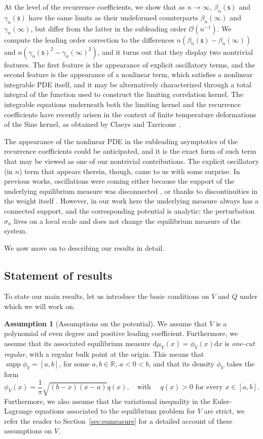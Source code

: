 \documentclass[reqno,a4paper,11pt]{amsart}
\DeclareMathOperator{\supp}{supp}
\newcommand{\R}{\mathbb{R}}
\newcommand{\Boh}{\mathcal{O}}
\newcommand{\dd}{\mathrm{d}}
\newcommand{\msf}{\mathsf}
\newcommand{\sad}{\msf s}
\theoremstyle{definition}
\newtheorem{assumption}[theorem]{Assumption}
\theoremstyle{remark}
\numberwithin{equation}{section}
\begin{document}
At the level of the recurrence coefficients, we show that as $n\to\infty$, $\beta_n(\sad)$ and $\gamma_n(\sad)$ have the same limits as their undeformed counterparts $\beta_n(\infty)$ and $\gamma_n(\infty)$, but differ from the latter in the subleading order $\Boh(n^{-1})$. We compute the leading order correction to the differences $n(\beta_n(\sad)-\beta_n(\infty))$ and $n(\gamma_n(\sad)^2-\gamma_n(\infty)^2)$, and it turns out that they display two nontrivial features. The first feature is the appearance of explicit oscillatory terms, and the second feature is the appearance of a nonlinear term, which satisfies a nonlinear integrable PDE itself, and it may be alternatively characterized through a total integral of the function used to construct the limiting correlation kernel. The integrable equations underneath both the limiting kernel and the recurrence coefficients have recently arisen in the context of finite temperature deformations of the Sine kernel, as obtained by Claeys and Tarricone \cite{ClaeysTarricone24}. 

The appearance of the nonlinear PDE in the subleading asymptotics of the recurrence coefficients could be anticipated, and it is the exact form of such term that may be viewed as one of our nontrivial contributions. The explicit oscillatory (in $n$) term that appears therein, though, came to us with some surprise. In previous works, oscillations were coming either because the support of the underlying equilibrium measure was disconnected \cite{bleher_its, DKMVZ1}, or thanks to discontinuities in the weight itself \cite{FoulquieMartinezFinkelshteinSousa2011}. However, in our work here the underlying measure always has a connected support, and the corresponding potential is analytic: the perturbation $\sigma_n$ lives on a local scale and does not change the equilibrium measure of the system.

We now move on to describing our results in detail.

\subsection{Statement of results}\hfill 

To state our main results, let us introduce the basic conditions on $V$ and $Q$ under which we will work on.

\begin{assumption}[Assumptions on the potential]\label{asump:V}
We assume that $V$ is a polynomial of even degree and positive leading coefficient. Furthermore, we assume that its associated equilibrium measure $\dd \mu_V(x) = \phi_V(x)\dd x$ is {\it one-cut regular}, with a regular bulk point at the origin. This means that $\supp\phi_V=[a,b]$, for some $a,b\in \R$, $a<0<b$, and that its density $\phi_V$ takes the form
%
$$
\phi_V(x) = \frac{1}{\pi}\sqrt{(b-x)(x-a)} q(x),\quad  \text{with }\quad q(x) > 0 \text{ for every } x\in [a,b].
$$
%
Furthermore, we also assume that the variational inequality in the Euler-Lagrange equations associated to the equilibrium problem for $V$ are strict, we refer the reader to Section~\ref{sec:eqmeasure} for a detailed account of these assumptions on $V$.
\end{assumption}
\end{document}
